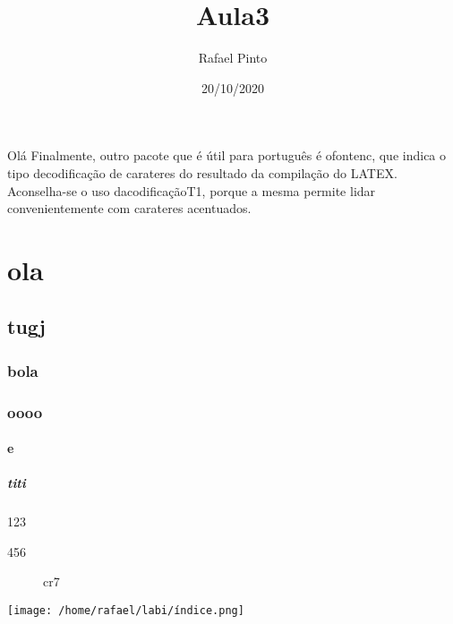 \documentclass[11pt,a4paper,openright,oneside]{report}
\title{\textbf{Aula3}}
\author{Rafael Pinto}
\date{20/10/2020}
\begin{document}
Olá 
Finalmente, outro pacote que é útil para português é ofontenc, que indica o tipo decodificação de carateres do resultado da compilação do LATEX. Aconselha-se o uso dacodificaçãoT1, porque a mesma permite lidar convenientemente com carateres acentuados.

\part{ola}
\chapter{tugj}
\tableofcontents
\section{bola}
\section{oooo}
\subsection{e}
\subsubsection{titi}
\renewcommand{\partname}{Parte}

\begin{table}
\caption{123}
\centerline{456}
\label{feito}
\end{table}

\begin{figure}[h]
\centerline{}
\caption{cr7}
\end{figure}

\texttt{[image: /home/rafael/labi/índice.png]}
\end{document}
